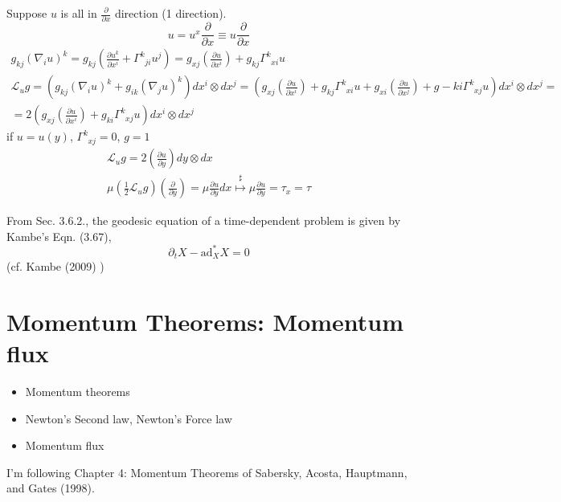 \documentclass[twoside,landscape,10pt]{amsart}
\theoremstyle{plain}
\theoremstyle{definition}
\theoremstyle{remark}
\theoremstyle{remark}
\begin{document}
\begin{multicols*}{2}
Suppose $u$ is all in $\frac{ \partial }{ \partial x}$ direction (1 direction).  
\[
u = u^x \frac{ \partial }{ \partial x} \equiv u \frac{ \partial }{ \partial x}
\]
\[
\begin{gathered}
  g_{kj} (\nabla_i u)^k = g_{kj} \left( \frac{ \partial u^k}{ \partial x^i} + \Gamma^k_{ \; \; ji} u^j \right) = g_{xj} \left( \frac{ \partial u}{ \partial x^i} \right) + g_{kj} \Gamma^k_{ \; \; xi } u \\
  \mathcal{L}_u g = (g_{kj} (\nabla_i u)^k + g_{ik} (\nabla_j u)^k ) dx^i \otimes dx^j = (g_{xj} \left( \frac{ \partial u}{ \partial x^i} \right) + g_{kj} \Gamma^k_{ \; \; xi} u + g_{xi} \left( \frac{ \partial u }{ \partial x^j} \right) + g-{ki} \Gamma^k_{ \; \; xj} u ) dx^i \otimes dx^j = \\
  = 2 \left( g_{xj} \left( \frac{ \partial u}{ \partial x^i} \right)+ g_{ki} \Gamma^k_{ \; \; xj} u \right) dx^i \otimes dx^j
\end{gathered}
\]
if $u=u(y)$, $\Gamma^k_{ \; \; xj} = 0$, $g=1$
\[
\begin{gathered}
  \mathcal{L}_u g = 2 \left( \frac{ \partial u }{ \partial y} \right) dy \otimes dx \\ 
  \mu\left( \frac{1}{2} \mathcal{L}_u g \right) \left( \frac{ \partial }{ \partial y} \right) = \mu \frac{ \partial u}{ \partial y } dx \overset{\sharp}{\mapsto } \mu \frac{ \partial u}{ \partial y} = \tau_x = \tau
\end{gathered}
\]



From Sec. 3.6.2., the geodesic equation of a time-dependent problem is given by Kambe's Eqn. (3.67), 
\[
\partial_tX - \text{ad}^*_XX = 0 
\]
(cf. Kambe (2009) \cite{TKambe2009})


\section{Momentum Theorems: Momentum flux}

\begin{itemize}
  \item Momentum theorems
  \item Newton's Second law, Newton's Force law
  \item Momentum flux
\end{itemize}

I'm following Chapter 4: Momentum Theorems of Sabersky, Acosta, Hauptmann, and Gates (1998)\cite{SAHG1998}.  


\end{multicols*}
\end{document}
